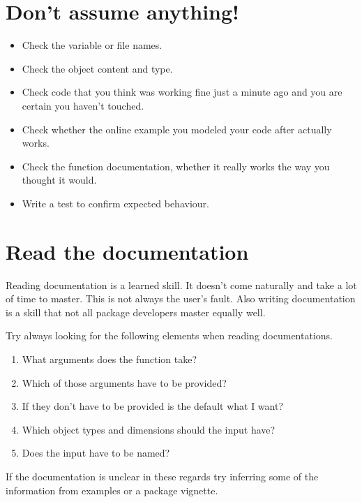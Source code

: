 \documentclass[]{book}
\providecommand{\tightlist}{%
  \setlength{\itemsep}{0pt}\setlength{\parskip}{0pt}}
\begin{document}
\hypertarget{dont-assume-anything}{%
\chapter{Don't assume anything!}\label{dont-assume-anything}}

\begin{itemize}
\tightlist
\item
  Check the variable or file names.
\item
  Check the object content and type.
\item
  Check code that you think was working fine just a minute ago and you are certain you haven't touched.
\item
  Check whether the online example you modeled your code after actually works.
\item
  Check the function documentation, whether it really works the way you thought it would.
\item
  Write a test to confirm expected behaviour.
\end{itemize}

\hypertarget{read-the-documentation}{%
\chapter{Read the documentation}\label{read-the-documentation}}

Reading documentation is a learned skill.
It doesn't come naturally and take a lot of time to master.
This is not always the user's fault.
Also writing documentation is a skill that not all package developers master equally well.

Try always looking for the following elements when reading documentations.

\begin{enumerate}
\def\labelenumi{(\arabic{enumi})}
\tightlist
\item
  What arguments does the function take?
\item
  Which of those arguments have to be provided?
\item
  If they don't have to be provided is the default what I want?
\item
  Which object types and dimensions should the input have?
\item
  Does the input have to be named?
\end{enumerate}

If the documentation is unclear in these regards try inferring some of the
information from examples or a package vignette.
\end{document}
